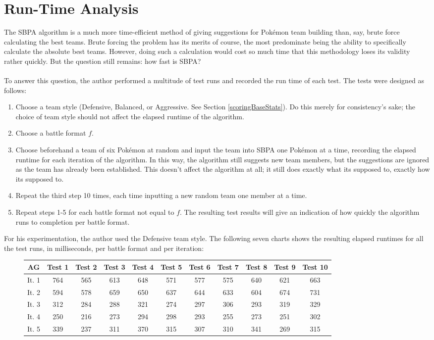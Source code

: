 \documentclass{article}
\begin{document}
\section{Run-Time Analysis}
The SBPA algorithm is a much more time-efficient method of giving suggestions for Pok\'emon team building than, say, brute force calculating the best teams. Brute forcing the problem has its merits of course, the most predominate being the ability to specifically calculate the absolute best teams. However, doing such a calculation would cost so much time that this methodology loses its validity rather quickly. But the question still remains: how fast is SBPA?\\\\
To answer this question, the author performed a multitude of test runs and recorded the run time of each test. The tests were designed as follows:
\begin{enumerate}
	\item Choose a team style (Defensive, Balanced, or Aggressive. See Section \ref{scoringBaseStats}). Do this merely for consistency's sake; the choice of team style should not affect the elapsed runtime of the algorithm.
	\item Choose a battle format $f$.
	\item Choose beforehand a team of six Pok\'emon at random and input the team into SBPA one Pok\'emon at a time, recording the elapsed runtime for each iteration of the algorithm. In this way, the algorithm still suggests new team members, but the suggestions are ignored as the team has already been established. This doesn't affect the algorithm at all; it still does exactly what its supposed to, exactly how its supposed to.
	\item Repeat the third step 10 times, each time inputting a new random team one member at a time.
	\item Repeat steps 1-5 for each battle format not equal to $f$. The resulting test results will give an indication of how quickly the algorithm runs to completion per battle format.
\end{enumerate}
For his experimentation, the author used the Defensive team style. The following seven charts shows the resulting elapsed runtimes for all the test runs, in milliseconds, per battle format and per iteration:
\begin{figure}[H]
	\begin{tabular}{c||c|c|c|c|c|c|c|c|c|c}
		AG&Test 1&Test 2&Test 3&Test 4&Test 5&Test 6&Test 7&Test 8&Test 9&Test 10\\
		\hline\hline
		It. 1&764&565&613&648&571&577&575&640&621&663\\
		It. 2&594&578&659&650&637&644&633&604&674&731\\
		It. 3&312&284&288&321&274&297&306&293&319&329\\
		It. 4&250&216&273&294&298&293&255&273&251&302\\
		It. 5&339&237&311&370&315&307&310&341&269&315\\
	\end{tabular}
	\centering
\end{figure}
\end{document}
